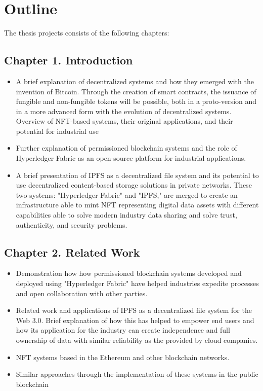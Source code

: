 \section{Outline}
The thesis projects consists of the following chapters:
\subsection{Chapter 1. Introduction}
\begin{itemize}
  \item A brief explanation of decentralized systems and how they emerged with the invention of Bitcoin.
Through the creation of smart contracts, the issuance of fungible and non-fungible tokens will be possible, both in a proto-version and in a more advanced form with the evolution of decentralized systems.
Overview of NFT-based systems, their original applications, and their potential for industrial use
\item Further explanation of permissioned blockchain systems and the role of Hyperledger Fabric as an open-source platform for industrial applications.
\item A brief presentation of IPFS as a decentralized file system and its potential to use decentralized content-based storage solutions in private networks. These two systems: "Hyperledger Fabric" and "IPFS," are merged to create an infrastructure able to mint NFT representing digital data assets with different capabilities able to solve modern industry data sharing and solve trust, authenticity, and security problems.
\end{itemize}
\subsection{Chapter 2. Related Work}
\begin{itemize}
    \item Demonstration how how permissioned blockchain systems developed and deployed using "Hyperledger Fabric" have helped industries expedite processes and open collaboration with other parties.
    \item Related work and applications of IPFS as a decentralized file system for the Web 3.0. Brief explanation of how this has helped to empower end users and how its application for the industry can create independence and full ownership of data with similar reliability as the provided by cloud companies.
    \item NFT systems based in the Ethereum and other blockchain networks.
    \item Similar approaches through the implementation of these systems in the public blockchain
\end{itemize}
